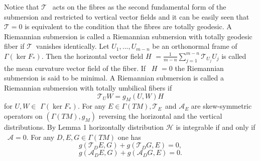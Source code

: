 \documentclass{amsart}
\theoremstyle{plain}
\numberwithin{equation}{section}
\begin{document}
Notice that $\mathcal{T}$ \ acts on the fibres as the second fundamental
form of the submersion and restricted to vertical vector fields and it can
be easily seen that $\mathcal{T}=0$ is equivalent to the condition that the
fibres are totally geodesic. A Riemannian submersion is called a Riemannian
submersion with totally geodesic fiber if $\mathcal{T}$ $\ $vanishes
identically. Let $U_{1},...,U_{m-n}$ be an orthonormal frame of $\Gamma
(\ker F_{\ast }).$ Then the horizontal vector field $H$ $=\frac{1}{m-n}\sum\limits_{j=1}^{m-n}\mathcal{T}_{U_{j}}U_{j}$ is called the mean
curvature vector field of the fiber. If \ $H$ $=0$ the Riemannian submersion
is said to be minimal. A Riemannian submersion is called a Riemannian
submersion with totally umbilical fibers if 
\begin{equation}
\mathcal{T}_{U}W=g_{M}(U,W)H  \label{4a}
\end{equation}for $U,W\in $ $\Gamma (\ker F_{\ast })$. For any $E\in \Gamma (TM),\mathcal{T}_{E\text{ }}$and $\mathcal{A}_{E}$ are skew-symmetric operators on $(\Gamma
(TM),g_{M})$ reversing the horizontal and the vertical distributions. By
Lemma 1 horizontally distribution $\mathcal{H}$ is integrable if and only if
\ $\mathcal{A=}0$. For any $D,E,G\in \Gamma (TM)$ one has\begin{equation}
g(\mathcal{T}_{D}E,G)+g(\mathcal{T}_{D}G,E)=0,  \label{4b}
\end{equation}\begin{equation}
g(\mathcal{A}_{D}E,G)+g(\mathcal{A}_{D}G,E)=0.  \label{4c}
\end{equation}
\end{document}

